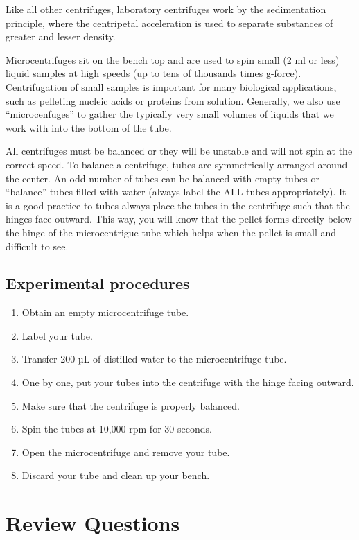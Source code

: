 \documentclass[]{book}
\providecommand{\tightlist}{%
  \setlength{\itemsep}{0pt}\setlength{\parskip}{0pt}}
\begin{document}
Like all other centrifuges, laboratory centrifuges work by the sedimentation principle, where the centripetal acceleration is used to separate substances of greater and lesser density.

Microcentrifuges sit on the bench top and are used to spin small (2 ml or less) liquid samples at high speeds (up to tens of thousands times g-force). Centrifugation of small samples is important for many biological applications, such as pelleting nucleic acids or proteins from solution. Generally, we also use ``microcenfuges'' to gather the typically very small volumes of liquids that we work with into the bottom of the tube.

All centrifuges must be balanced or they will be unstable and will not spin at the correct speed. To balance a centrifuge, tubes are symmetrically arranged around the center. An odd number of tubes can be balanced with empty tubes or ``balance'' tubes filled with water (always label the ALL tubes appropriately). It is a good practice to tubes always place the tubes in the centrifuge such that the hinges face outward. This way, you will know that the pellet forms directly below the hinge of the microcentrigue tube which helps when the pellet is small and difficult to see.

\hypertarget{experimental-procedures-7}{%
\subsection{Experimental procedures}\label{experimental-procedures-7}}

\begin{enumerate}
\def\labelenumi{\arabic{enumi}.}
\tightlist
\item
  Obtain an empty microcentrifuge tube.
\item
  Label your tube.
\item
  Transfer 200 µL of distilled water to the microcentrifuge tube.
\item
  One by one, put your tubes into the centrifuge with the hinge facing outward.
\item
  Make sure that the centrifuge is properly balanced.
\item
  Spin the tubes at 10,000 rpm for 30 seconds.
\item
  Open the microcentrifuge and remove your tube.
\item
  Discard your tube and clean up your bench.
\end{enumerate}

\hypertarget{review-questions-4}{%
\section{Review Questions}\label{review-questions-4}}
\end{document}
